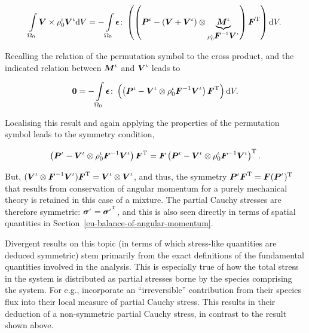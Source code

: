 \begin{displaymath}
\int\limits_{\Omega_0}\mbox{\boldmath$ V$}\times\rho^\iota_0\mbox{\boldmath$ V$}^\iota\mathrm{d}V =
-\int\limits_{\Omega_0}\mbox{\boldmath$\epsilon$}\colon
\left(\left(\mbox{\boldmath$ P$}^\iota-\left(\mbox{\boldmath$ V$}+\mbox{\boldmath$ V$}^\iota\right)
\otimes\underbrace{\mbox{\boldmath$ M$}^\iota}_{\rho_0^\iota\mbox{\boldmath$ F$}^{-1}\mbox{\boldmath$ V$}^\iota}\right)
\mbox{\boldmath$ F$}^\mathrm{T}\right)\mathrm{d}V.
\end{displaymath}

\noindent Recalling the relation of the permutation symbol to the
cross product, and the indicated relation between $\mbox{\boldmath$ M$}^\iota$ and
$\mbox{\boldmath$ V$}^\iota$ leads to

\begin{equation}
{\bf 0} =
-\int\limits_{\Omega_0}\mbox{\boldmath$\epsilon$}\colon\left(\left(\mbox{\boldmath$ P$}^\iota-\mbox{\boldmath$ V$}^\iota
\otimes \rho_0^\iota\mbox{\boldmath$ F$}^{-1}\mbox{\boldmath$ V$}^\iota\right)
\mbox{\boldmath$ F$}^\mathrm{T}\right)\mathrm{d}V.\nonumber
\end{equation}

\noindent Localising this result and again applying the properties of
the permutation symbol leads to the symmetry condition,

\begin{equation}
\left(\mbox{\boldmath$ P$}^\iota-\mbox{\boldmath$ V$}^\iota\otimes\rho^\iota_0\mbox{\boldmath$ F$}^{-1}\mbox{\boldmath$ V$}^\iota\right)
\mbox{\boldmath$ F$}^\mathrm{T} = \mbox{\boldmath$ F$}\left(\mbox{\boldmath$ P$}^\iota-\mbox{\boldmath$ V$}^\iota \otimes
\rho^\iota_0\mbox{\boldmath$ F$}^{-1}\mbox{\boldmath$ V$}^\iota\right)^\mathrm{T}.
\label{localbalanceofangularmomentum}
\end{equation}

\noindent But, $(\mbox{\boldmath$ V$}^\iota\otimes\mbox{\boldmath$ F$}^{-1}\mbox{\boldmath$ V$}^\iota)\mbox{\boldmath$ F$}^\mathrm{T} =
\mbox{\boldmath$ V$}^\iota\otimes\mbox{\boldmath$ V$}^\iota$, and thus, the symmetry
$\mbox{\boldmath$ P$}^\iota\mbox{\boldmath$ F$}^\mathrm{T} = \mbox{\boldmath$ F$}(\mbox{\boldmath$ P$}^\iota)^\mathrm{T}$ that results
from conservation of angular momentum for a purely mechanical theory
is retained in this case of a mixture. The partial Cauchy stresses are
therefore symmetric: $\mbox{\boldmath$\sigma$}^\iota = \mbox{\boldmath$\sigma$}^{\iota^\mathrm{T}}$, and
this is also seen directly in terms of spatial quantities in
Section~\ref{eu-balance-of-angular-momentum}.

Divergent results on this topic (in terms of which stress-like
quantities are deduced symmetric) stem primarily from the exact
definitions of the fundamental quantities involved in the
analysis. This is especially true of how the total stress in the
system is distributed as partial stresses borne by the species
comprising the system. For e.g., \citet{EpsteinMaugin:2000}
incorporate an ``irreversible'' contribution from their species flux
into their local measure of partial Cauchy stress. This results in
their deduction of a non-symmetric partial Cauchy stress, in contrast
to the result shown above.

